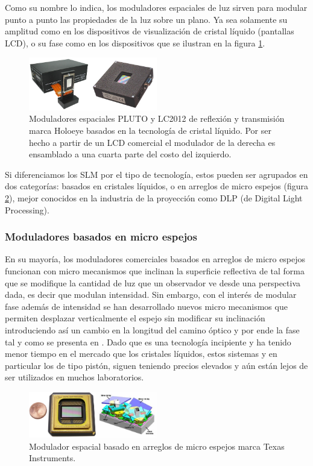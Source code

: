 Como su nombre lo indica, los moduladores espaciales de luz sirven
para modular punto a punto las propiedades de la luz sobre un
plano. Ya sea solamente su amplitud como en los dispositivos de
visualización de cristal líquido (pantallas LCD), o su fase como en
los dispositivos que se ilustran en la figura \ref{fig:LCDSLM}.
\begin{figure}[h!]
\centering
    \includegraphics[width=0.5\textwidth]{LCDSLM.png}
\caption{Moduladores espaciales PLUTO y LC2012 de reflexión y
  transmisión marca Holoeye basados en la tecnología de cristal
  líquido. Por ser hecho a partir de un LCD comercial el modulador de
  la derecha es ensamblado a una cuarta parte del costo del izquierdo.}
\label{fig:LCDSLM}
\end{figure}

Si diferenciamos los SLM por el tipo de tecnología, estos pueden ser
agrupados en dos categorías: basados en cristales líquidos, o en
arreglos de micro espejos (figura \ref{fig:MEMSLM}), mejor 
conocidos en la industria de la proyección como DLP (de Digital Light
Processing).  
\subsubsection{Moduladores basados en micro espejos}
En su mayoría, los moduladores comerciales basados en arreglos de micro
espejos funcionan con micro mecanismos que inclinan la superficie
reflectiva de tal forma que se modifique la cantidad de luz que un
observador ve desde una perspectiva dada, es decir que modulan
intensidad. Sin embargo, con el interés de modular fase además de
intensidad se han desarrollado nuevos micro mecanismos que
permiten desplazar verticalmente el espejo sin modificar su
inclinación introduciendo así un cambio en la longitud del camino
óptico y por ende la fase tal y como se presenta en \cite{Wu2010,
  Liesener2006}. Dado que es una tecnología incipiente y ha tenido
menor tiempo en el mercado que los cristales líquidos, estos sistemas
y en particular los de tipo pistón, siguen teniendo precios elevados y
aún están lejos de ser utilizados en muchos laboratorios.

\begin{figure}[h!]
\centering
    \includegraphics[width=0.5\textwidth]{MEMSLM.png}
\caption{Modulador espacial basado en arreglos de micro espejos marca Texas Instruments.}
\label{fig:MEMSLM}
\end{figure}

